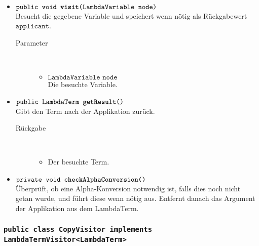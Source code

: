 \begin{description}
\begin{itemize}
		\item $\texttt{public void \textbf{visit}(LambdaVariable node)}$ \\ Besucht die gegebene Variable und speichert wenn nötig als Rückgabewert $\texttt{applicant}$.
		\begin{description}
			\item[Parameter] \hfill \\
			\vspace{-.8cm}
			\begin{itemize}
				\item $\texttt{LambdaVariable node}$ \\ Die besuchte Variable.
			\end{itemize}
		\end{description}
		
		\item $\texttt{public LambdaTerm \textbf{getResult}()}$ \\ Gibt den Term nach der Applikation zurück.
		\begin{description}
			\item[Rückgabe] \hfill \\
			\vspace{-.8cm}
			\begin{itemize}
				\item Der besuchte Term.
			\end{itemize}
		\end{description}
		
		\item $\texttt{private void \textbf{checkAlphaConversion}()}$ \\ Überprüft, ob eine Alpha-Konversion notwendig ist, falls dies noch nicht getan wurde, und führt diese wenn nötig aus. Entfernt danach das Argument der Applikation aus dem LambdaTerm.
	\end{itemize}
\end{description}

\subsubsection{\normalfont \texttt{public class \textbf{CopyVisitor} implements LambdaTermVisitor<LambdaTerm>}}

